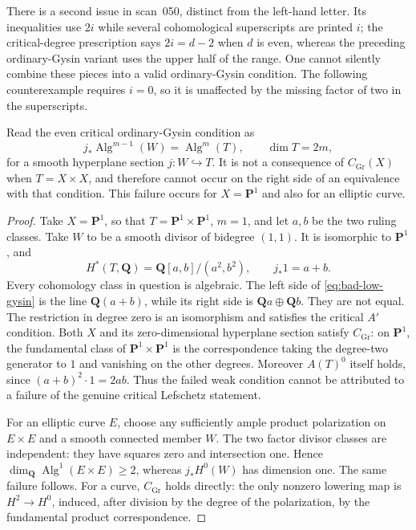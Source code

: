 There is a second issue in scan~050, distinct from the left-hand letter.
Its inequalities use $2i$ while several cohomological superscripts
are printed $i$; the critical-degree prescription says $2i=d-2$
when $d$ is even, whereas the preceding ordinary-Gysin variant uses
the upper half of the range.  One cannot silently combine these
pieces into a valid ordinary-Gysin condition.  The following
counterexample requires $i=0$, so it is unaffected by the missing
factor of two in the superscripts.

\begin{proposition}
\label{prop:literal-critical-fails}
Read the even critical ordinary-Gysin condition as
\begin{equation}
 j_*\operatorname{Alg}^{m-1}(W)=\operatorname{Alg}^{m}(T),
 \qquad \dim T=2m,
 \label{eq:bad-low-gysin}
\end{equation}
for a smooth hyperplane section $j:W\hookrightarrow T$.
It is not a consequence of $C_{\mathrm{Gr}}(X)$ when $T=X\times X$,
and therefore cannot occur on the right side of an equivalence with
that condition.  This failure occurs for $X=\mathbf P^1$ and also
for an elliptic curve.
\end{proposition}
\begin{proof}
Take $X=\mathbf P^1$, so that $T=\mathbf P^1\times\mathbf P^1$,
$m=1$, and let $a,b$ be the two ruling classes.  Take $W$ to be a
smooth divisor of bidegree $(1,1)$.  It is isomorphic to
$\mathbf P^1$, and
\[
 H^*(T,\mathbf Q)=\mathbf Q[a,b]/(a^2,b^2),\qquad
 j_*1=a+b.
\]
Every cohomology class in question is algebraic.  The left side of
\eqref{eq:bad-low-gysin} is the line $\mathbf Q(a+b)$, while its
right side is $\mathbf Qa\oplus\mathbf Qb$.  They are not equal.
The restriction in degree zero is an isomorphism and satisfies the
critical $A'$ condition.  Both $X$ and its zero-dimensional hyperplane
section satisfy $C_{\mathrm{Gr}}$: on $\mathbf P^1$, the fundamental
class of $\mathbf P^1\times\mathbf P^1$ is the correspondence taking
the degree-two generator to $1$ and vanishing on the other degrees.
Moreover $A(T)^0$ itself holds, since
$(a+b)^2\cdot1=2ab$.  Thus the failed weak condition cannot be
attributed to a failure of the genuine critical Lefschetz statement.

For an elliptic curve $E$, choose any sufficiently ample product
polarization on $E\times E$ and a smooth connected member $W$.
The two factor divisor classes are independent: they have squares
zero and intersection one.  Hence
$\dim_{\mathbf Q}\operatorname{Alg}^1(E\times E)\ge2$, whereas
$j_*H^0(W)$ has dimension one.  The same failure follows.  For a
curve, $C_{\mathrm{Gr}}$ holds directly: the only nonzero lowering
map is $H^2\to H^0$, induced, after division by the degree of the
polarization, by the fundamental product correspondence.
\end{proof}

